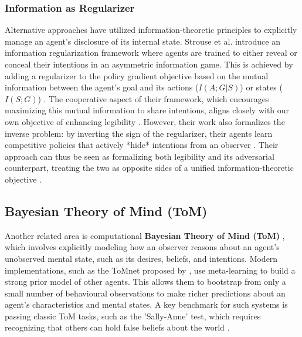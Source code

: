 \documentclass[12pt, a4paper]{report}
\begin{document}
\subsubsection{Information as Regularizer}
Alternative approaches have utilized information-theoretic principles to explicitly manage an agent's disclosure of its internal state. Strouse et al. \cite{NEURIPS2018_1ef03ed0} introduce an information regularization framework where agents are trained to either reveal or conceal their intentions in an asymmetric information game. This is achieved by adding a regularizer to the policy gradient objective based on the mutual information between the agent's goal and its actions ($I(A;G|S)$) or states ($I(S;G)$) \cite{NEURIPS2018_1ef03ed0}. The cooperative aspect of their framework, which encourages maximizing this mutual information to share intentions, aligns closely with our own objective of enhancing legibility \cite{NEURIPS2018_1ef03ed0}. However, their work also formalizes the inverse problem: by inverting the sign of the regularizer, their agents learn competitive policies that actively *hide* intentions from an observer \cite{NEURIPS2018_1ef03ed0}. Their approach can thus be seen as formalizing both legibility and its adversarial counterpart, treating the two as opposite sides of a unified information-theoretic objective \cite{NEURIPS2018_1ef03ed0}.

\subsection{Bayesian Theory of Mind (ToM)}
Another related area is computational \textbf{Bayesian Theory of Mind (ToM)} \cite{Rabinowitz2018}, which involves explicitly modeling how an observer reasons about an agent's unobserved mental state, such as its desires, beliefs, and intentions. Modern implementations, such as the ToMnet proposed by \cite{Rabinowitz2018}, use meta-learning to build a strong prior model of other agents. This allows them to bootstrap from only a small number of behavioural observations to make richer predictions about an agent's characteristics and mental states. A key benchmark for such systems is passing classic ToM tasks, such as the 'Sally-Anne' test, which requires recognizing that others can hold false beliefs about the world \cite{Rabinowitz2018}.
\end{document}
